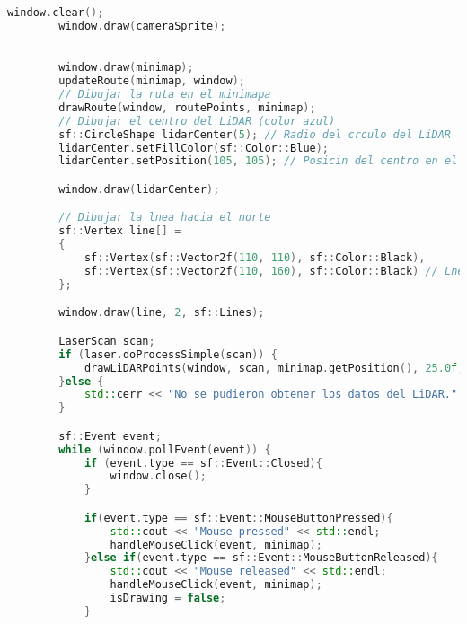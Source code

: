 \begin{lstlisting}[language={C++}, caption={Primer ajuste de c\'odigo}, label={Script}]
        window.clear();
        window.draw(cameraSprite);

        
        window.draw(minimap);
        updateRoute(minimap, window);
        // Dibujar la ruta en el minimapa
        drawRoute(window, routePoints, minimap);
        // Dibujar el centro del LiDAR (color azul)
        sf::CircleShape lidarCenter(5); // Radio del crculo del LiDAR
        lidarCenter.setFillColor(sf::Color::Blue);
        lidarCenter.setPosition(105, 105); // Posicin del centro en el minimapa

        window.draw(lidarCenter);

        // Dibujar la lnea hacia el norte
        sf::Vertex line[] =
        {
            sf::Vertex(sf::Vector2f(110, 110), sf::Color::Black),
            sf::Vertex(sf::Vector2f(110, 160), sf::Color::Black) // Lnea hacia arriba (norte)
        };

        window.draw(line, 2, sf::Lines);

        LaserScan scan;
        if (laser.doProcessSimple(scan)) {
            drawLiDARPoints(window, scan, minimap.getPosition(), 25.0f, max_range);
        }else {
            std::cerr << "No se pudieron obtener los datos del LiDAR." << std::endl;
        }

        sf::Event event;
        while (window.pollEvent(event)) {
            if (event.type == sf::Event::Closed){
                window.close();
            }

            if(event.type == sf::Event::MouseButtonPressed){
                std::cout << "Mouse pressed" << std::endl;
                handleMouseClick(event, minimap);
            }else if(event.type == sf::Event::MouseButtonReleased){
                std::cout << "Mouse released" << std::endl;
                handleMouseClick(event, minimap);
                isDrawing = false;
            }
            




\end{lstlisting}
